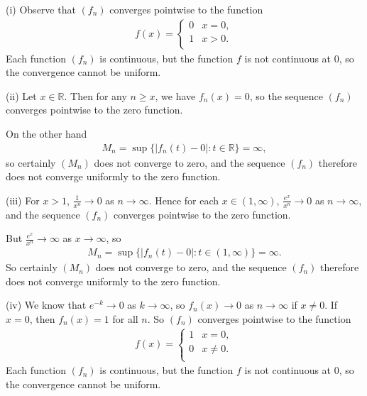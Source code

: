 \documentclass[letterpaper,10pt,english]{jupyterBook}
\begin{document}
\sphinxAtStartPar
{\hyperref[\detokenize{Problems:id55}]{}}
(i) Observe that \((f_n)\) converges pointwise to the function
\begin{equation*}
\begin{split}
f(x) = \left\{ \begin{array}{ll}
0 & x=0, \\
1 & x>0. \\
\end{array} \right.
\end{split}
\end{equation*}
\sphinxAtStartPar
Each function \((f_n)\) is continuous, but the function \(f\) is not continuous at \(0\), so the convergence cannot be uniform.

\sphinxAtStartPar
(ii) Let \(x\in \mathbb{R}\). Then for any \(n\geq x\), we have \(f_n (x) =0\), so the sequence \((f_n)\) converges pointwise to the zero function.

On the other hand
\begin{equation*}
\begin{split}
M_n = \sup \{ |f_n(t) -0| : t\in \mathbb{R} \} = \infty,
\end{split}
\end{equation*}
\sphinxAtStartPar
so certainly \((M_n)\) does not converge to zero, and the sequence \((f_n)\) therefore does not converge uniformly to the zero function.

\sphinxAtStartPar
(iii) For \(x>1\), \(\frac{1}{x^n} \rightarrow 0\) as \(n\rightarrow \infty\). Hence for each \(x\in (1,\infty )\), \(\frac{e^x}{x^n}\rightarrow 0\) as \(n\rightarrow \infty\), and the sequence \((f_n)\) converges pointwise to the zero function.

But \(\frac{e^x}{x^n}\rightarrow \infty\) as \(x\rightarrow \infty\), so
\begin{equation*}
\begin{split}
M_n = \sup \{ |f_n(t) -0| : t\in (1,\infty ) \} = \infty.
\end{split}
\end{equation*}
\sphinxAtStartPar
So certainly \((M_n)\) does not converge to zero, and the sequence \((f_n)\) therefore does not converge uniformly to the zero function.

\sphinxAtStartPar
(iv) We know that \(e^{-k}\rightarrow 0\) as \(k\rightarrow \infty\), so \(f_n(x)\rightarrow 0\) as \(n\rightarrow \infty\) if \(x\neq 0\). If \(x=0\), then \(f_n(x)=1\) for all \(n\). So \((f_n)\) converges pointwise to the function
\begin{equation*}
\begin{split}
f(x) = \left\{ \begin{array}{ll}
1 & x=0, \\
0 & x\neq 0. \\
\end{array} \right.
\end{split}
\end{equation*}
\sphinxAtStartPar
Each function \((f_n)\) is continuous, but the function \(f\) is not continuous at \(0\), so the convergence cannot be uniform.
\end{document}
